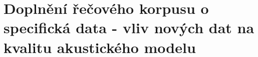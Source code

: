 \section{Doplnění řečového korpusu o specifická data - vliv nových dat na kvalitu akustického modelu}
\label{chap:realisation:corpus}






